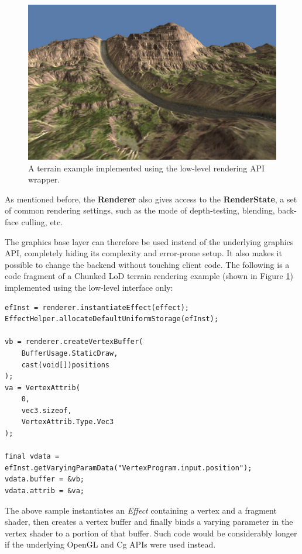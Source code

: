 \begin{figure}[h!]
  \centering
    \includegraphics[width=0.9\linewidth]{./Figures/terrainRendering.jpg}
    \caption[terrainRendering]{A terrain example implemented using the low-level rendering API wrapper.}
  \label{fig:terrainRendering}
\end{figure}

As mentioned before, the \textbf{Renderer} also gives access to the \textbf{RenderState}, a set of common rendering settings, such as the mode of depth-testing, blending, back-face culling, etc.

The graphics base layer can therefore be used instead of the underlying graphics API, completely hiding its complexity and error-prone setup. It also makes it possible to change the backend without touching client code. The following is a code fragment of a Chunked LoD \cite{chunkedLoD} terrain rendering example (shown in Figure \ref{fig:terrainRendering}) implemented using the low-level interface only:
\begin{lstlisting}[frame=single]
efInst = renderer.instantiateEffect(effect);
EffectHelper.allocateDefaultUniformStorage(efInst);

vb = renderer.createVertexBuffer(
	BufferUsage.StaticDraw,
	cast(void[])positions
);
va = VertexAttrib(
	0,
	vec3.sizeof,
	VertexAttrib.Type.Vec3
);

final vdata = efInst.getVaryingParamData("VertexProgram.input.position");
vdata.buffer = &vb;
vdata.attrib = &va;
\end{lstlisting}
The above sample instantiates an \emph{Effect} containing a vertex and a fragment shader, then creates a vertex buffer and finally binds a varying parameter in the vertex shader to a portion of that buffer. Such code would be considerably longer if the underlying OpenGL and Cg APIs were used instead.
	
